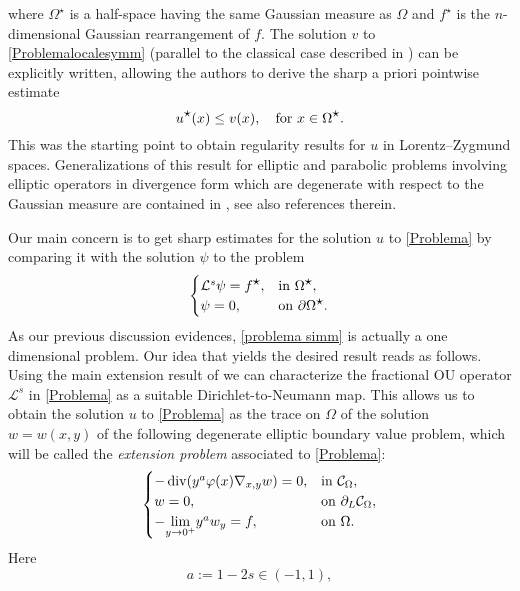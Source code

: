 \documentclass[a4paper,10pt,reqno]{amsart}
\numberwithin{equation}{section}
\begin{document}
where $\Omega^{\displaystyle\star}$ is a half-space having the same Gaussian measure as $\Omega$
and $f^{\displaystyle\star}$ is the $n$-dimensional Gaussian rearrangement of $f$.
The solution $v$ to \eqref{Problemalocalesymm} (parallel to the classical case described in \cite{Ta1})
can be explicitly written, allowing the authors to derive the sharp a priori pointwise estimate
$$u^{\displaystyle\star}(x)\leq v(x),\quad\hbox{for}~x\in \Omega^{\displaystyle\star}.$$
This was the starting point to obtain regularity results for $u$ in Lorentz--Zygmund spaces.
Generalizations of this result for elliptic and parabolic problems involving
elliptic operators in divergence form which are degenerate with respect to the Gaussian measure
are contained in \cite{chiacchio,dFP}, see also references therein.

Our main concern is to get sharp estimates
for the solution $u$ to \eqref{Problema} by comparing it with the solution $\psi$ to the problem
\begin{equation}\label{problema simm}
\begin{cases}
\mathcal{L}^{s}\psi=f^{\displaystyle\star}, & \hbox{in}~\Omega^{\displaystyle\star},\\
\psi=0, & \hbox{on}~\partial\Omega^{\displaystyle\star}.
\end{cases}
\end{equation}
As our previous discussion evidences, \eqref{problema simm} is actually a one dimensional problem.
Our idea that yields the desired result reads as follows.
Using the main extension result of \cite{Stinga-Torrea} we can characterize the fractional OU operator
$\mathcal{L}^s$ in \eqref{Problema} as a suitable Dirichlet-to-Neumann map.
This allows us to obtain the solution $u$ to \eqref{Problema}
as the trace on $\Omega$ of the solution $w=w(x,y)$ of the following degenerate elliptic boundary value problem, which will be called the \emph{extension problem}
associated to \eqref{Problema}:
\begin{equation}\label{Problema estensione}
\begin{cases}
-\operatorname{div}(y^a\varphi(x)\nabla_{x,y}w)=0, &\hbox{in}~\mathcal{C}_{\Omega},\\
w=0,&\hbox{on}~\partial_{L}\mathcal{C}_{\Omega},\\
-\underset{y\rightarrow0^{+}}{\lim}y^aw_y=f,&\hbox{on}~\Omega.
\end{cases}
\end{equation}
Here
\begin{equation}\label{eq:a}
a:=1-2s\in(-1,1),
\end{equation}
\end{document}
